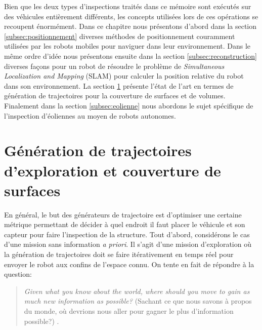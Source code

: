 \label{sec:RevLitt}

\color{red}
Bien que les deux types d'inspections traités dans ce mémoire sont exécutés sur des véhicules entièrement différents, les concepts utilisées lors de ces opérations se recoupent énormément. Dans ce chapitre nous présentons d'abord dans la section \ref{subsec:positionnement} diverses méthodes de positionnement couramment utilisées par les robots mobiles pour naviguer dans leur environnement. Dans le même ordre d'idée nous présentons ensuite dans la section \ref{subsec:reconstruction} diverses façons pour un robot de résoudre le problème de \textit{Simultaneous Localization and Mapping} (SLAM) pour calculer la position relative du robot dans son environnement. La section \ref{subsec:generation} présente l'état de l'art en termes de génération de trajectoires pour la couverture de surfaces et de volumes.
Finalement dans la section \ref{subsec:eolienne} nous abordons le sujet spécifique de l'inspection d'éoliennes au moyen de robots autonomes.
\color{black}

\section{Génération de trajectoires d'exploration et couverture de surfaces}\label{subsec:generation}

En général, le but des générateurs de trajectoire est d'optimiser une certaine métrique permettant de décider à quel endroit il faut placer le véhicule et son capteur pour faire l'inspection de la structure. Tout d'abord, considérons le cas d'une mission sans information \textit{a priori}. Il s'agit d'une mission d'exploration où la génération de trajectoires doit se faire itérativement en temps réel pour envoyer le robot aux confins de l'espace connu. On tente en fait de répondre à la question:

\begin{quote}
  \emph{Given what you know about the world, where should you move to gain as much new information as possible?} (Sachant ce que nous savons à propos du monde, où devrions nous aller pour gagner le plus d'information possible?) \citep{Yamauchi1997}.
\end{quote}

